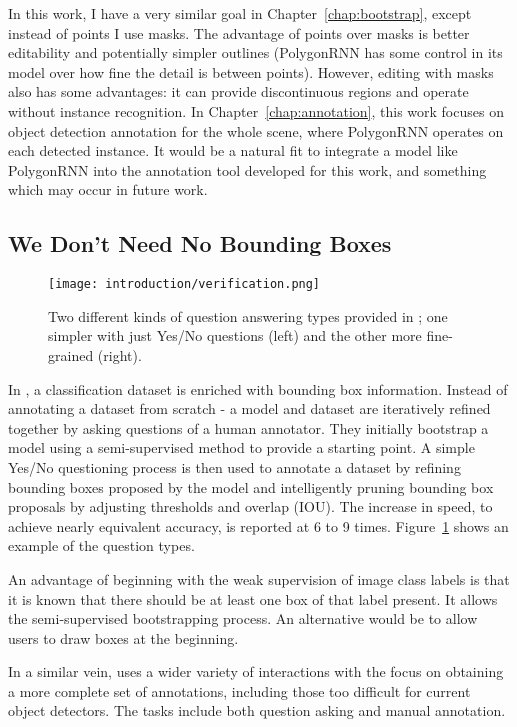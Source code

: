 In this work, I have a very similar goal in Chapter~\ref{chap:bootstrap}, except instead of points I use masks. The advantage of points over masks is better editability and potentially simpler outlines (PolygonRNN has some control in its model over how fine the detail is between points). However, editing with masks also has some advantages: it can provide discontinuous regions and operate without instance recognition. In Chapter~\ref{chap:annotation}, this work focuses on object detection annotation for the whole scene, where PolygonRNN operates on each detected instance. It would be a natural fit to integrate a model like PolygonRNN into the annotation tool developed for this work, and something which may occur in future work.


\subsection {We Don't Need No Bounding Boxes}

\begin{figure}[h]
  \centering
  \texttt{[image: introduction/verification.png]}
  \caption{Two different kinds of question answering types provided in \cite{Papadopoulos2016}; one simpler with just Yes/No questions (left) and the other more fine-grained (right).}
  \label{fig:verification}
\end{figure}

In \cite{Papadopoulos2016}, a classification dataset is enriched with bounding box information. Instead of annotating a dataset from scratch - a model and dataset are iteratively refined together by asking questions of a human annotator. They initially bootstrap a model using a semi-supervised method  \cite{Cinbis2017} to provide a starting point. A simple Yes/No questioning process is then used to annotate a dataset by refining bounding boxes proposed by the model and intelligently pruning bounding box proposals by adjusting thresholds and overlap (\gls{IOU}). The increase in speed, to achieve nearly equivalent accuracy, is reported at 6 to 9 times.  Figure~\ref{fig:verification} shows an example of the question types.

An advantage of beginning with the weak supervision of image class labels is that it is known that there should be at least one box of that label present. It allows the semi-supervised bootstrapping process. An alternative would be to allow users to draw boxes at the beginning. 

In a similar vein, \cite{Russakovsky2015a} uses a wider variety of interactions with the focus on obtaining a more complete set of annotations, including those too difficult for current object detectors. The tasks include both question asking and manual annotation.


